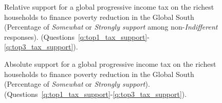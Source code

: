 \begin{figure}[h!]
    \caption[Relative support for a global income tax on the richest to fund LICs]{Relative support for a global progressive income tax on the richest households to finance poverty reduction in the Global South (Percentage of \textit{Somewhat} or \textit{Strongly support} among non-\textit{Indifferent} responses). (Questions~\ref{q:top1_tax_support}-\ref{q:top3_tax_support}).
    }\label{fig:top_tax_share}
\end{figure}

\begin{figure}[h!]
    \caption[Absolute support for an income tax on top 1\% to fund LICs]{Absolute support for a global progressive income tax on the richest households to finance poverty reduction in the Global South (Percentage of \textit{Somewhat} or \textit{Strongly support}). (Questions~\ref{q:top1_tax_support}-\ref{q:top3_tax_support}).
    }\label{fig:top_tax_positive}
\end{figure}


